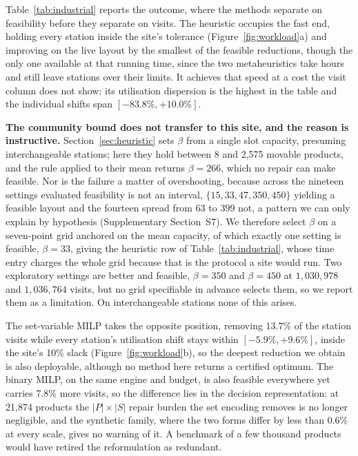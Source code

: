 \documentclass[]{interact}
\begin{document}
Table~\ref{tab:industrial} reports the outcome, where the methods separate on feasibility before they separate on visits. The heuristic occupies the fast end, holding every station inside the site's tolerance (Figure~\ref{fig:workload}a) and improving on the live layout by the smallest of the feasible reductions, though the only one available at that running time, since the two metaheuristics take hours and still leave stations over their limits. It achieves that speed at a cost the visit column does not show: its utilisation dispersion is the highest in the table and the individual shifts span $[-83.8\%, +10.0\%]$.

\textbf{The community bound does not transfer to this site, and the reason is instructive.} Section~\ref{sec:heuristic} sets $\beta$ from a single slot capacity, presuming interchangeable stations; here they hold between 8 and 2{,}575 movable products, and the rule applied to their mean returns $\beta=266$, which no repair can make feasible. Nor is the failure a matter of overshooting, because across the nineteen settings evaluated feasibility is not an interval, $\{15,33,47,350,450\}$ yielding a feasible layout and the fourteen spread from $63$ to $399$ not, a pattern we can only explain by hypothesis (Supplementary Section~S7). We therefore select $\beta$ on a seven-point grid anchored on the mean capacity, of which exactly one setting is feasible, $\beta=33$, giving the heuristic row of Table~\ref{tab:industrial}, whose time entry charges the whole grid because that is the protocol a site would run. Two exploratory settings are better and feasible, $\beta=350$ and $\beta=450$ at $1{,}030{,}978$ and $1{,}036{,}764$ visits, but no grid specifiable in advance selects them, so we report them as a limitation. On interchangeable stations none of this arises.

The set-variable MILP takes the opposite position, removing 13.7\% of the station visits while every station's utilisation shift stays within $[-5.9\%, +9.6\%]$, inside the site's 10\% slack (Figure~\ref{fig:workload}b), so the deepest reduction we obtain is also deployable, although no method here returns a certified optimum. The binary MILP, on the same engine and budget, is also feasible everywhere yet carries 7.8\% more visits, so the difference lies in the decision representation: at 21,874 products the $|P| \times |S|$ repair burden the set encoding removes is no longer negligible, and the synthetic family, where the two forms differ by less than 0.6\% at every scale, gives no warning of it. A benchmark of a few thousand products would have retired the reformulation as redundant.
\end{document}

